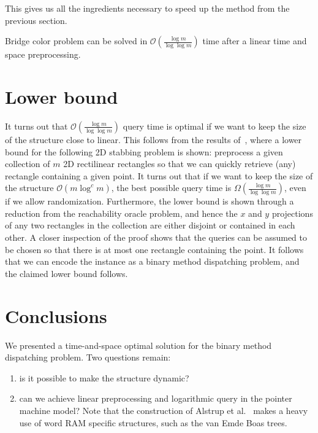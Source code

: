 \documentclass[runningheads]{llncs}
\begin{document}
This gives us all the ingredients necessary to speed up the method from the previous section.

\begin{theorem}
Bridge color problem can be solved in $\mathcal{O}(\frac{\log m}{\log\log m})$ time after a linear time and space preprocessing.
\end{theorem}

\section{Lower bound}
\label{section:lower bound}

It turns out that $\mathcal{O}(\frac{\log m}{\log\log m})$ query time is optimal if we want to keep the size of the structure close to linear. This follows from the results of~\cite{Patrascu}, where a lower bound for the following 2D stabbing problem is shown: preprocess a given collection of $m$ 2D rectilinear rectangles so that we can quickly retrieve (any) rectangle containing a given point. It turns out that if we want to keep the size of the structure $\mathcal{O}(m\log^c m)$, the best possible query time is $\Omega(\frac{\log m}{\log\log m})$, even if we allow randomization. Furthermore, the lower bound is shown through a reduction from the reachability oracle problem, and hence the $x$ and $y$ projections of any two rectangles in the collection are either disjoint or contained in each other. A closer inspection of the proof shows that the queries can be assumed to be chosen so that there is at most one rectangle containing the point. It follows that we can encode the instance as a binary method dispatching problem, and the claimed lower bound follows.

\section{Conclusions}

We presented a time-and-space optimal solution for the binary method dispatching problem. Two questions remain:

\begin{enumerate}
\item is it possible to make the structure dynamic?
\item can we achieve linear preprocessing and logarithmic query in the pointer machine model? Note that the construction of Alstrup et al.~\cite{Alstrup} makes a heavy use of word RAM specific structures, such as the van Emde Boas trees.
\end{enumerate}



\end{document}
